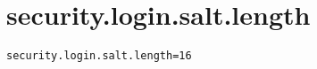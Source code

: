 \section{security.login.salt.length}
\label{configuration:SecurityLoginSaltLength}
\ClearAPI
\TODO
{}
\begin{lstlisting}[style=Props,caption={Usage example for \textit{security.login.salt.length}}]
security.login.salt.length=16
\end{lstlisting}